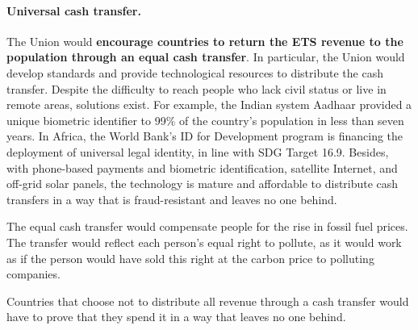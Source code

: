\documentclass[12pt,english]{article}
\begin{document}
\paragraph{Universal cash transfer.} 
The Union would \textbf{encourage countries to return the ETS revenue to the population through an equal cash transfer}. In particular, the Union would develop standards and provide technological resources to distribute the cash transfer. Despite the difficulty to reach people who lack civil status or live in remote areas, solutions exist. For example, the Indian system Aadhaar provided a unique biometric identifier to 99\% of the country's population in less than seven years. In Africa, the World Bank's ID for Development program is financing the deployment of universal legal identity, in line with SDG Target 16.9. Besides, with phone-based payments and biometric identification, satellite Internet, and off-grid solar panels, the technology is mature and affordable to distribute cash transfers in a way that is fraud-resistant and leaves no one behind.

The equal cash transfer would compensate people for the rise in fossil fuel prices. The transfer would reflect each person's equal right to pollute, as it would work as if the person would have sold this right at the carbon price to polluting companies.

Countries that choose not to distribute all revenue through a cash transfer would have to prove that they spend it %
in a way that leaves no one behind.

\end{document}
